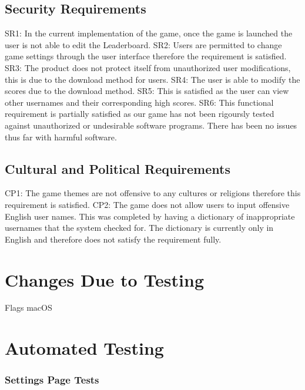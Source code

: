\documentclass[12pt, titlepage]{article}
\begin{document}
\subsection{Security Requirements}	
SR1: In the current implementation of the game, once the game is launched the user is not able to edit the Leaderboard. 
SR2: Users are permitted to change game settings through the user interface therefore the requirement is satisfied. 
SR3: The product does not protect itself from unauthorized user modifications, this is due to the download method for users. 
SR4: The user is able to modify the scores due to the download method. 
SR5: This is satisfied as the user can view other usernames and their corresponding high scores. 
SR6: This functional requirement is partially satisfied as our game has not been rigoursly tested against unauthorized or undesirable software programs. There has been no issues thus far with harmful software. 

\subsection{Cultural and Political Requirements}
CP1: The game themes are not offensive to any cultures or religions therefore this requirement is satisfied. 
CP2: The game does not allow users to input offensive English user names. This was completed by having a dictionary of inappropriate usernames that the system checked for. The dictionary is currently only in English and therefore does not satisfy the requirement fully. 

\section{Changes Due to Testing}


Flags
macOS



\section{Automated Testing}
\subsubsection{Settings Page Tests}
	
\end{document}
